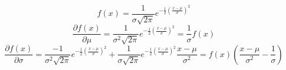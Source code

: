 \documentclass{article}[12pt,a4]
\begin{document}
\begin{equation}
f(x) = \frac{1}{\sigma \sqrt{2\pi}} e^{-\frac{1}{2}\left(\frac{x-\mu}{\sigma}\right)^2}
\end{equation}
\begin{equation}
\frac{\partial f(x)}{\partial \mu} = \frac{1}{\sigma^2 \sqrt{2\pi}} e^{-\frac{1}{2}\left(\frac{x-\mu}{\sigma}\right)^2} = \frac{1}{\sigma}f(x)
\end{equation}
\begin{equation}
\frac{\partial f(x)}{\partial \sigma} = \frac{-1}{\sigma^2 \sqrt{2\pi}} e^{-\frac{1}{2}\left(\frac{x-\mu}{\sigma}\right)^2}  +
\frac{1}{\sigma \sqrt{2\pi}} e^{-\frac{1}{2}\left(\frac{x-\mu}{\sigma}\right)^2} \frac{x-\mu}{\sigma^2} =
f(x) \left( \frac{x-\mu}{\sigma^2} - \frac{1}{\sigma} \right)
\end{equation}
\end{document}
